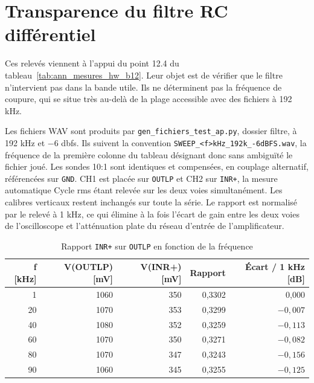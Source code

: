 
\section{Transparence du filtre RC différentiel}
\label{ann:mesures_filtre}

Ces relevés viennent à l'appui du point 12.4 du tableau~\ref{tab:ann_mesures_hw_b12}. Leur objet est de vérifier que le filtre n'intervient pas dans la bande utile. Ils ne déterminent pas la fréquence de coupure, qui se situe très au-delà de la plage accessible avec des fichiers à 192 kHz.

Les fichiers WAV sont produits par \texttt{gen\_fichiers\_test\_ap.py}, dossier filtre, à 192 kHz et $-6$ \gls{dbfs}. Ils suivent la convention \texttt{SWEEP\_<f>kHz\_192k\_-6dBFS.wav}, la fréquence de la première colonne du tableau désignant donc sans ambiguïté le fichier joué. Les sondes 10:1 sont identiques et compensées, en couplage alternatif, référencées sur \texttt{GND}. CH1 est placée sur \texttt{OUTLP} et CH2 sur \texttt{INR+}, la mesure automatique Cycle \gls{rms} étant relevée sur les deux voies simultanément. Les calibres verticaux restent inchangés sur toute la série. Le rapport est normalisé par le relevé à 1 kHz, ce qui élimine à la fois l'écart de gain entre les deux voies de l'oscilloscope et l'atténuation plate du réseau d'entrée de l'amplificateur.

\begin{table}[H]
  \centering
  \caption{Rapport \texttt{INR+} sur \texttt{OUTLP} en fonction de la fréquence}
  \label{tab:ann_filtre_rc}
  \small
  \setlength{\tabcolsep}{6pt}
  \begin{tabular}{@{}r r r r r@{}}
    \toprule
    \textbf{f [kHz]} & \textbf{V(OUTLP) [mV]} & \textbf{V(INR+) [mV]} & \textbf{Rapport} & \textbf{Écart / 1 kHz [dB]} \\
    \midrule
    1                & 1060                   & 350                   & 0,3302           & 0,000                       \\
    20               & 1070                   & 353                   & 0,3299           & $-0,007$                    \\
    40               & 1080                   & 352                   & 0,3259           & $-0,113$                    \\
    60               & 1070                   & 350                   & 0,3271           & $-0,082$                    \\
    80               & 1070                   & 347                   & 0,3243           & $-0,156$                    \\
    90               & 1060                   & 345                   & 0,3255           & $-0,125$                    \\
    \bottomrule
  \end{tabular}
\end{table}

